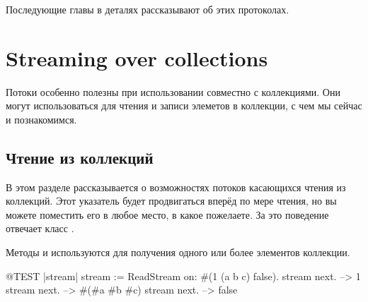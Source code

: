 \documentclass[a4paper,10pt,twoside]{book}
\begin{document}
Последующие главы в деталях рассказывают об этих протоколах.

\section{Streaming over collections}

Потоки особенно полезны при использовании совместно с коллекциями. Они могут использоваться для чтения и записи элеметов в коллекции, с чем мы сейчас и познакомимся.

\subsection{Чтение из коллекций}

В этом разделе рассказывается о возможностях потоков касающихся чтения из коллекций.  Этот указатель будет продвигаться вперёд по мере чтения, но вы можете поместить его в любое место, в какое пожелаете. За это поведение отвечает класс .

Методы  и  используются для получения одного или более элементов коллекции.

\begin{code}{@TEST |stream|}
stream := ReadStream on: #(1 (a b c) false).
stream next. -->   1
stream next. -->   #(#a #b #c)
stream next. -->   false
\end{code}
\end{document}
